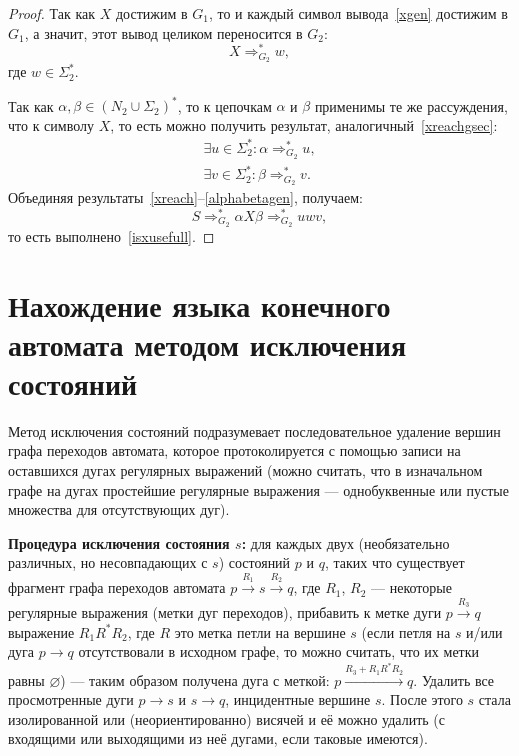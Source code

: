 \begin{proof}
Так как $X$ достижим в $G_1$, то и каждый символ вывода~\eqref{xgen} достижим в
$G_1$, а значит, этот вывод целиком переносится в $G_2$:
\begin{equation}\label{xreachgsec}
    X \Rightarrow^*_{G_2}w, 
\end{equation}
где $w \in  \Sigma_2^*$.

Так как $\alpha, \beta \in (N_2 \cup \Sigma_2)^*$, то к цепочкам $\alpha$ и
$\beta$ применимы те же рассуждения, что к символу $X$, то есть можно получить
результат, аналогичный~\eqref{xreachgsec}:
\begin{align}
\exists u \in \Sigma_2^*\colon \alpha \Rightarrow^{*}_{G_2} u,\\
\exists v \in \Sigma_2^*\colon \beta \Rightarrow^{*}_{G_2} v.
\label{alphabetagen}
\end{align}
Объединяя результаты~\eqref{xreach}–\eqref{alphabetagen}, получаем:
$$
    S \Rightarrow^{*}_{G_2} \alpha X \beta \Rightarrow^{*}_{G_2} uwv,
$$
то есть выполнено~\eqref{isxusefull}.
\end{proof}

\section{Нахождение языка конечного автомата методом исключения состояний}
Метод исключения состояний подразумевает последовательное удаление вершин графа
переходов автомата, которое протоколируется с помощью записи на оставшихся дугах
регулярных выражений (можно считать, что в изначальном графе на дугах
простейшие регулярные выражения — однобуквенные или пустые множества для
отсутствующих дуг).

\textbf{Процедура исключения состояния $s$:} для каждых двух (необязательно
различных, но несовпадающих с $s$) состояний $p$ и $q$, таких что существует
фрагмент графа переходов автомата $p \xrightarrow{R_1} s \xrightarrow{R_2} q$,
где $R_1$, $R_2$ — некоторые регулярные выражения (метки дуг переходов),
прибавить к метке дуги $p \xrightarrow{R_3} q$ выражение $R_1R^{\ast}R_2$, где
$R$ это метка петли на вершине $s$ (если петля на $s$ и/или дуга $p \to q$
отсутствовали в исходном графе, то можно считать, что их метки равны
$\varnothing$) — таким образом получена дуга с меткой: $p \xrightarrow{R_3 +
R_1R^{\ast}R_2} q$. Удалить все просмотренные дуги $p \to s$ и $s \to q$,
инцидентные вершине $s$. После этого $s$ стала изолированной или
(неориентированно) висячей и её можно удалить (с входящими или выходящими из неё
дугами, если таковые имеются).

